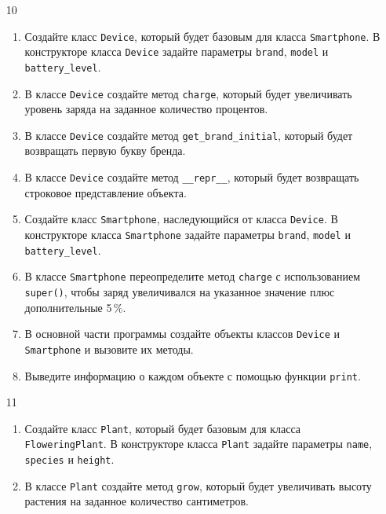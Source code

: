 \begin{enumerate}
\item[10] 
\begin{enumerate}[leftmargin=*]
    \item Создайте класс \texttt{Device}, который будет базовым для класса \texttt{Smartphone}. В конструкторе класса \texttt{Device} задайте параметры \texttt{brand}, \texttt{model} и \texttt{battery\_level}.
    
    \item В классе \texttt{Device} создайте метод \texttt{charge}, который будет увеличивать уровень заряда на заданное количество процентов.
    
    \item В классе \texttt{Device} создайте метод \texttt{get\_brand\_initial}, который будет возвращать первую букву бренда.
    
    \item В классе \texttt{Device} создайте метод \texttt{\_\_repr\_\_}, который будет возвращать строковое представление объекта.
    
    \item Создайте класс \texttt{Smartphone}, наследующийся от класса \texttt{Device}. В конструкторе класса \texttt{Smartphone} задайте параметры \texttt{brand}, \texttt{model} и \texttt{battery\_level}.
    
    \item В классе \texttt{Smartphone} переопределите метод \texttt{charge} с использованием \texttt{super()}, чтобы заряд увеличивался на указанное значение плюс дополнительные 5\,\%.
    
    \item В основной части программы создайте объекты классов \texttt{Device} и \texttt{Smartphone} и вызовите их методы.
    
    \item Выведите информацию о каждом объекте с помощью функции \texttt{print}.
\end{enumerate}

\item[11] 
\begin{enumerate}[leftmargin=*]
    \item Создайте класс \texttt{Plant}, который будет базовым для класса \texttt{FloweringPlant}. В конструкторе класса \texttt{Plant} задайте параметры \texttt{name}, \texttt{species} и \texttt{height}.
    
    \item В классе \texttt{Plant} создайте метод \texttt{grow}, который будет увеличивать высоту растения на заданное количество сантиметров.
    

\end{enumerate}
\end{enumerate}
